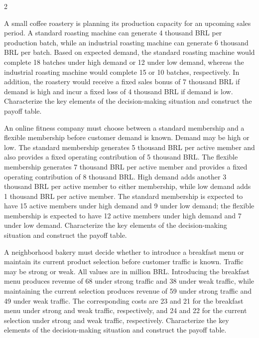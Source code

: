 \begin{multicols}{2}
		\vspace{-3mm}
		
		A small coffee roastery is planning its production capacity for an upcoming sales period. A standard roasting machine can generate 4 thousand BRL per production batch, while an industrial roasting machine can generate 6 thousand BRL per batch. Based on expected demand, the standard roasting machine would complete 18 batches under high demand or 12 under low demand, whereas the industrial roasting machine would complete 15 or 10 batches, respectively. In addition, the roastery would receive a fixed sales bonus of 7 thousand BRL if demand is high and incur a fixed loss of 4 thousand BRL if demand is low. Characterize the key elements of the decision-making situation and construct the payoff table.
		
		\columnbreak
		
		An online fitness company must choose between a standard membership and a flexible membership before customer demand is known. Demand may be high or low. The standard membership generates 5 thousand BRL per active member and also provides a fixed operating contribution of 5 thousand BRL. The flexible membership generates 7 thousand BRL per active member and provides a fixed operating contribution of 8 thousand BRL. High demand adds another 3 thousand BRL per active member to either membership, while low demand adds 1 thousand BRL per active member. The standard membership is expected to have 15 active members under high demand and 9 under low demand; the flexible membership is expected to have 12 active members under high demand and 7 under low demand. Characterize the key elements of the decision-making situation and construct the payoff table.
		
		A neighborhood bakery must decide whether to introduce a breakfast menu or maintain its current product selection before customer traffic is known. Traffic may be strong or weak. All values are in million BRL. Introducing the breakfast menu produces revenue of 68 under strong traffic and 38 under weak traffic, while maintaining the current selection produces revenue of 59 under strong traffic and 49 under weak traffic. The corresponding costs are 23 and 21 for the breakfast menu under strong and weak traffic, respectively, and 24 and 22 for the current selection under strong and weak traffic, respectively. Characterize the key elements of the decision-making situation and construct the payoff table.
		

\end{multicols}
